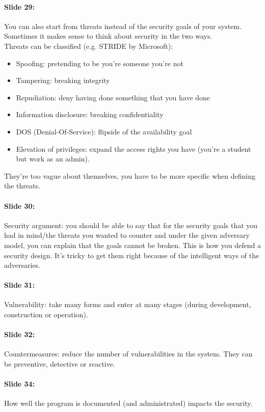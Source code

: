 \documentclass[10pt,a4paper]{report}
\begin{document}
\paragraph{Slide 29:} You can also start from threats instead of the security goals of your system. Sometimes it makes sense to think about security in the two ways.\\
Threats can be classified (e.g. STRIDE by Microsoft):
\begin{itemize}
\item Spoofing: pretending to be you're someone you're not
\item Tampering: breaking integrity
\item Repudiation: deny having done something that you have done
\item Information disclosure: breaking confidentiality
\item DOS (Denial-Of-Service): flipside of the availability goal
\item Elevation of privileges: expand the access rights you have (you're a student but work as an admin).
\end{itemize}
They're too vague about themselves, you have to be more specific when defining the threats.

\paragraph{Slide 30:} Security argument: you should be able to say that for the security goals that you had in mind/the threats you wanted to counter and under the given adversary model, you can explain that the goals cannot be broken. This is how you defend a security design. It's tricky to get them right because of the intelligent ways of the adversaries.

\paragraph{Slide 31:} Vulnerability: take many forms and enter at many stages (during development, construction or operation).

\paragraph{Slide 32:} Countermeasures: reduce the number of vulnerabilities in the system. They can be preventive, detective or reactive.

\paragraph{Slide 34:} How well the program is documented (and administrated) impacts the security.
\end{document}
